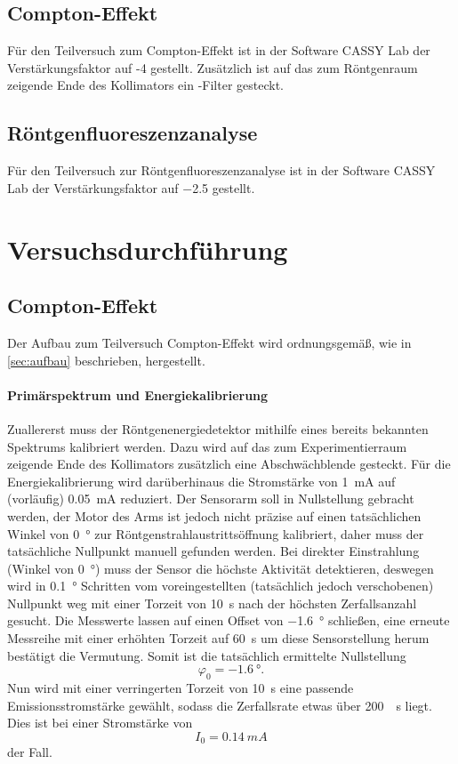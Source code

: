 \documentclass[ngerman]{scrartcl}
\begin{document}
\subsection{Compton-Effekt}
\label{subsec:aufbau_compton}

Für den Teilversuch zum Compton-Effekt ist in der Software CASSY Lab der Verstärkungsfaktor auf -4 gestellt. Zusätzlich ist auf das zum Röntgenraum zeigende Ende des Kollimators ein -Filter gesteckt.


\subsection{Röntgenfluoreszenzanalyse}
\label{subsec:aufbau_fluoreszenz}

Für den Teilversuch zur Röntgenfluoreszenzanalyse ist in der Software CASSY Lab der Verstärkungsfaktor auf \num{-2.5} gestellt.



\section{Versuchsdurchführung}
\label{sec:durchfuehrung}

\subsection{Compton-Effekt}
\label{subsec:durchfuehrung_compton}

Der Aufbau zum Teilversuch Compton-Effekt wird ordnungsgemäß, wie in \autoref{sec:aufbau} beschrieben, hergestellt.

\paragraph{Primärspektrum und Energiekalibrierung}
Zuallererst muss der Röntgenenergiedetektor mithilfe eines bereits bekannten Spektrums kalibriert werden. Dazu wird auf das zum Experimentierraum zeigende Ende des Kollimators zusätzlich eine Abschwächblende gesteckt. Für die Energiekalibrierung wird darüberhinaus die Stromstärke von \SI{1}{mA} auf (vorläufig) \SI{0.05}{mA} reduziert. Der Sensorarm soll in Nullstellung gebracht werden, der Motor des Arms ist jedoch nicht präzise auf einen tatsächlichen Winkel von \SI{0}{\degree} zur Röntgenstrahlaustrittsöffnung kalibriert, daher muss der tatsächliche Nullpunkt manuell gefunden werden. Bei direkter Einstrahlung (Winkel von \SI{0}{\degree}) muss der Sensor die höchste Aktivität detektieren, deswegen wird in \SI{0.1}{\degree} Schritten vom voreingestellten (tatsächlich jedoch verschobenen) Nullpunkt weg mit einer Torzeit von \SI{10}{s} nach der höchsten Zerfallsanzahl gesucht. Die Messwerte lassen auf einen Offset von \SI{-1.6}{\degree} schließen, eine erneute Messreihe mit einer erhöhten Torzeit auf \SI{60}{s} um diese Sensorstellung herum bestätigt die Vermutung. Somit ist die tatsächlich ermittelte Nullstellung
\[\varphi_0 = \SI{-1.6}{\degree}.\]
Nun wird mit einer verringerten Torzeit von \SI{10}{s} eine passende Emissionsstromstärke gewählt, sodass die Zerfallsrate etwas über \SI{200}{\per\second} liegt. Dies ist bei einer Stromstärke von
\[I_0=\SI{0.14}{mA}\]
der Fall.
\end{document}
